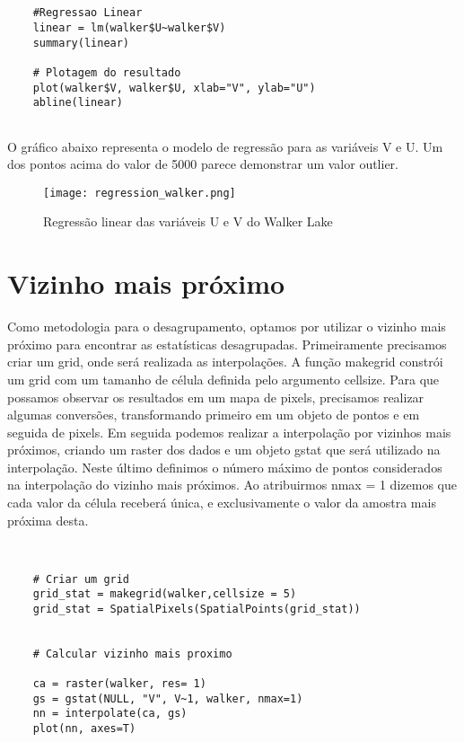 \begin{scriptsize}
	\estiloR
	\begin{lstlisting}[caption={Criação de um vetor em R}, label=lst:rcode]
	
	
	#Regressao Linear
	linear = lm(walker$U~walker$V)
	summary(linear)
	
	# Plotagem do resultado
	plot(walker$V, walker$U, xlab="V", ylab="U")
	abline(linear)
	
	\end{lstlisting}
\end{scriptsize}


O gráfico abaixo representa o modelo de regressão para as variáveis V e U. Um dos pontos acima do valor de 5000 parece demonstrar um valor outlier. 


\FloatBarrier
\begin{figure}[H]
	\centering
	\texttt{[image: regression\_walker.png]}	
	\caption{Regressão linear das variáveis U e V do Walker Lake}
	\label{walk}
\end{figure}
\FloatBarrier

\section{Vizinho mais próximo} 

Como metodologia para o desagrupamento, optamos por utilizar o vizinho mais próximo para encontrar as estatísticas desagrupadas. Primeiramente precisamos criar um grid, onde será realizada as interpolações. A função makegrid constrói um grid com um tamanho de célula definida pelo argumento cellsize. Para que possamos observar os resultados em um mapa de pixels, precisamos realizar algumas conversões, transformando primeiro em um objeto de pontos e em seguida de pixels. Em seguida podemos realizar a interpolação por vizinhos mais próximos, criando um raster dos dados e um objeto gstat que será utilizado na interpolação. Neste último definimos o número máximo de pontos considerados na interpolação do vizinho mais próximos. Ao atribuirmos nmax = 1 dizemos que cada valor da célula receberá única, e exclusivamente o valor da amostra mais próxima desta.

\begin{scriptsize}
	\estiloR
	\begin{lstlisting}[caption={Criação de um vetor em R}, label=lst:rcode]
	
	
	# Criar um grid 
	grid_stat = makegrid(walker,cellsize = 5)
	grid_stat = SpatialPixels(SpatialPoints(grid_stat))
	
	
	# Calcular vizinho mais proximo
	
	ca = raster(walker, res= 1)
	gs = gstat(NULL, "V", V~1, walker, nmax=1)
	nn = interpolate(ca, gs)
	plot(nn, axes=T)
	
	\end{lstlisting}
\end{scriptsize}

